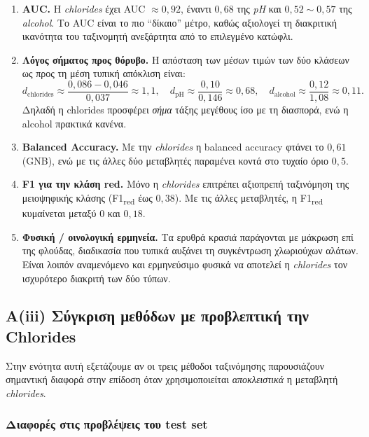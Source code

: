 \documentclass[11pt,a4paper]{article}
\begin{document}
\begin{enumerate}[leftmargin=1.5cm]
    \item \textbf{AUC.} Η \textit{chlorides} έχει AUC $\approx 0{,}92$, έναντι
    $0{,}68$ της \textit{pH} και $0{,}52\sim 0{,}57$ της \textit{alcohol}.
    Το AUC είναι
    το πιο ``δίκαιο'' μέτρο, καθώς αξιολογεί τη διακριτική ικανότητα του
    ταξινομητή ανεξάρτητα από το επιλεγμένο κατώφλι.

    \item \textbf{Λόγος σήματος προς θόρυβο.} Η απόσταση των μέσων τιμών
    των δύο κλάσεων ως προς τη μέση τυπική απόκλιση είναι:
    \[
    d_{\text{chlorides}} \approx \frac{0{,}086 - 0{,}046}{0{,}037} \approx 1{,}1,
    \quad
    d_{\text{pH}} \approx \frac{0{,}10}{0{,}146} \approx 0{,}68,
    \quad
    d_{\text{alcohol}} \approx \frac{0{,}12}{1{,}08} \approx 0{,}11.
    \]
    Δηλαδή η chlorides προσφέρει \textit{σήμα} τάξης μεγέθους ίσο με τη
    διασπορά, ενώ η alcohol πρακτικά κανένα.

    \item \textbf{Balanced Accuracy.} Με την \textit{chlorides} η balanced
    accuracy φτάνει το $0{,}61$ (GNB), ενώ με τις άλλες δύο μεταβλητές
    παραμένει κοντά στο τυχαίο όριο $0{,}5$.

    \item \textbf{F1 για την κλάση red.} Μόνο η \textit{chlorides}
    επιτρέπει αξιοπρεπή ταξινόμηση της μειοψηφικής κλάσης
    (F1\textsubscript{red} έως $0{,}38$). Με τις άλλες μεταβλητές, η
    F1\textsubscript{red} κυμαίνεται μεταξύ $0$ και $0{,}18$.

    \item \textbf{Φυσική / οινολογική ερμηνεία.} Τα ερυθρά κρασιά
    παράγονται με μάκρωση επί της φλούδας, διαδικασία που τυπικά αυξάνει
    τη συγκέντρωση χλωριούχων αλάτων. Είναι λοιπόν αναμενόμενο και
    ερμηνεύσιμο φυσικά να αποτελεί η \textit{chlorides} τον ισχυρότερο
    διακριτή των δύο τύπων.
\end{enumerate}

\subsection{Α(iii) Σύγκριση μεθόδων με προβλεπτική την Chlorides}

Στην ενότητα αυτή εξετάζουμε αν οι τρεις μέθοδοι ταξινόμησης παρουσιάζουν
σημαντική διαφορά στην επίδοση όταν χρησιμοποιείται \emph{αποκλειστικά}
η μεταβλητή \textit{chlorides}.

\subsubsection*{Διαφορές στις προβλέψεις του test set}
\end{document}
